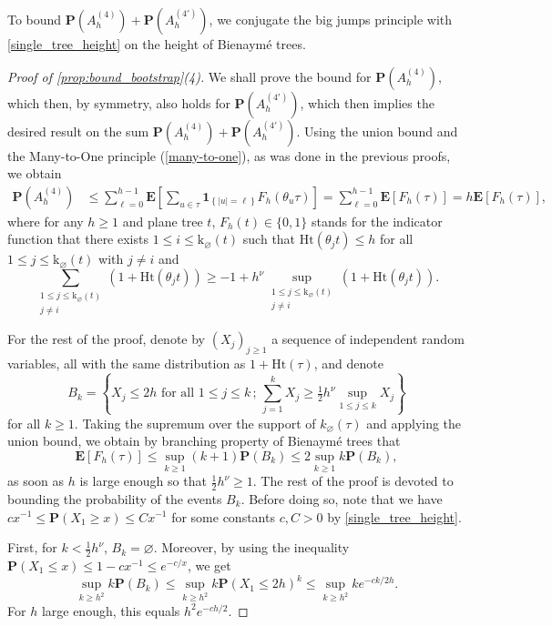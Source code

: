 \documentclass[11pt,reqno]{amsart}
\newcommand{\1}{\mathbf{1}}
\newcommand{\0}{\mathbf{0}}
\newcommand{\E}{{\mathbf E}}
\newcommand{\I}[1]{{\mathbf 1}_{\left\{#1\right\}}}
\newcommand{\prob}{\mathbf{P}}
\newcommand{\ex}{\mathbf{E}}
\newcommand{\Ht}{\mathrm{Ht}}
\newcommand{\rk}{\mathrm{k}}
\renewcommand{\emptyset}{\varnothing}
\begin{document}
To bound $\prob(A_h^{(4)})+\prob(A_{h}^{(4')})$, we conjugate the big jumps principle with \cref{single_tree_height} on the height of Bienaymé trees.

\begin{proof}[Proof of \cref{prop:bound_bootstrap}(4)]
    We shall prove the bound for $\prob(A_{h}^{(4)})$, which then, by symmetry, also holds for $\prob(A_{h}^{(4')})$, which then implies the desired result on the sum $\prob(A_{h}^{(4)})+\prob(A_{h}^{(4')})$.
    Using the union bound and the Many-to-One principle (\cref{many-to-one}), as was done in the previous proofs, we obtain
    \begin{align*}
        \prob(A_{h}^{(4)}) &\leq \sum_{\ell=0}^{h-1} \ex\left[ \sum_{u \in \tau}\I{|u| = \ell} F_h(\theta_u \tau) \right] =  \sum_{\ell=0}^{h-1} \E[F_h(\tau)] = h\E[F_h(\tau)],
    \end{align*}
    where for any $h\geq 1$ and plane tree $t$, $F_h(t)\in\{0,1\}$ stands for the indicator function that there exists $1\leq i\leq \rk_\varnothing(t)$ such that $\Ht(\theta_j t)\leq h$ for all $1\leq j\leq \rk_\varnothing(t)$ with $j\neq i$ and
    \[\sum_{\substack{1\leq j\leq \rk_\varnothing(t) \\ j\neq i}}(1+\Ht(\theta_j t))\geq -1+h^\nu\sup_{\substack{1\leq j\leq \rk_\varnothing(t) \\ j\neq i}}(1+\Ht(\theta_j t)).\]
    
    For the rest of the proof, denote by $(X_j)_{j\geq 1}$ a sequence of independent random variables, all with the same distribution as $1+\Ht(\tau)$, and denote
    \[B_k = \left\{ X_j \leq 2h \text{ for all $1\leq j\leq k$}\, ;\, \sum_{j=1}^{k} X_j \geq \tfrac{1}{2} h^\nu \sup_{1 \leq j \leq k} X_j \right\}\]
    for all $k\geq 1$. Taking the supremum over the support of $k_\emptyset(\tau)$ and applying the union bound, we obtain by branching property of Bienaymé trees that
    \[\E[F_h(\tau)]\leq \sup_{k \geq 1} (k+1)\prob(B_k) \leq 2\sup_{k \geq 1} k\prob(B_k),\]
    as soon as $h$ is large enough so that $\tfrac{1}{2}h^\nu\geq 1$. The rest of the proof is devoted to bounding the probability of the events $B_k$. Before doing so, note that we have $cx^{-1} \leq \prob(X_1 \geq x) \leq Cx^{-1}$ for some constants $c,C > 0$ by \cref{single_tree_height}.
    
     First, for $k<\tfrac{1}{2}h^\nu$, $B_k=\emptyset$. 
     Moreover, by using the inequality $\prob(X_1\le x)\le 1-c x^{-1}\le e^{-c/x}$, we get 
    \[\sup_{k\ge h^{2}} k \prob(B_k)\le  \sup_{k\ge h^{2}} k \prob\left(X_1\le 2h\right)^k \le \sup_{k\ge h^{2}} k e^{-c k/2h}.\] 
    For $h$ large enough, this equals $h^{2}e^{-c h/2}$. 
    

\end{proof}
\end{document}
